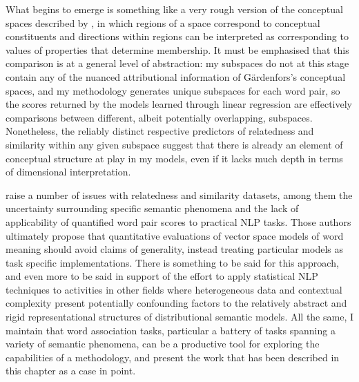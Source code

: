
What begins to emerge is something like a very rough version of the conceptual spaces described by \cite{Gardenfors2000}, in which regions of a space correspond to conceptual constituents and directions within regions can be interpreted as corresponding to values of properties that determine membership.  It must be emphasised that this comparison is at a general level of abstraction: my subspaces do not at this stage contain any of the nuanced attributional information of G\"{a}rdenfors's conceptual spaces, and my methodology generates unique subspaces for each word pair, so the scores returned by the models learned through linear regression are effectively comparisons between different, albeit potentially overlapping, subspaces.  Nonetheless, the reliably distinct respective predictors of relatedness and similarity within any given subspace suggest that there is already an element of conceptual structure at play in my models, even if it lacks much depth in terms of dimensional interpretation.

\cite{FaruquiEA2016} raise a number of issues with relatedness and similarity datasets, among them the uncertainty surrounding specific semantic phenomena and the lack of applicability of quantified word pair scores to practical NLP tasks.  Those authors ultimately propose that quantitative evaluations of vector space models of word meaning should avoid claims of generality, instead treating particular models as task specific implementations.  There is something to be said for this approach, and even more to be said in support of the effort to apply statistical NLP techniques to activities in other fields where heterogeneous data and contextual complexity present potentially confounding factors to the relatively abstract and rigid representational structures of distributional semantic models.  All the same, I maintain that word association tasks, particular a battery of tasks spanning a variety of semantic phenomena, can be a productive tool for exploring the capabilities of a methodology, and present the work that has been described in this chapter as a case in point.


